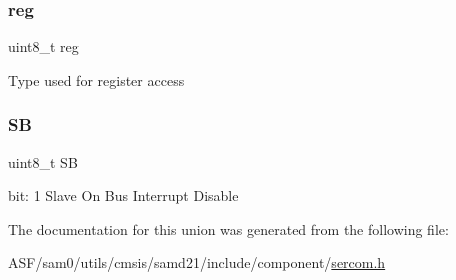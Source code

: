 \subsubsection{\texorpdfstring{reg}{reg}}
{\footnotesize\ttfamily uint8\+\_\+t reg}

Type used for register access \mbox{\label{union_s_e_r_c_o_m___i2_c_m___i_n_t_e_n_c_l_r___type_af6e25191020f32790ed358bdb7152678}} 
\subsubsection{\texorpdfstring{SB}{SB}}
{\footnotesize\ttfamily uint8\+\_\+t SB}

bit\+: 1 Slave On Bus Interrupt Disable 

The documentation for this union was generated from the following file\+:\begin{DoxyCompactItemize}
\item 
A\+S\+F/sam0/utils/cmsis/samd21/include/component/\mbox{\hyperlink{utils_2cmsis_2samd21_2include_2component_2sercom_8h}{sercom.\+h}}\end{DoxyCompactItemize}
